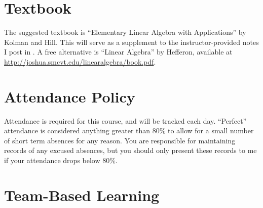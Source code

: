 \documentclass{article}
\begin{document}
\section*{\fontsize{12}{15}\selectfont Textbook}
The suggested textbook is ``Elementary Linear Algebra with Applications'' by Kolman and Hill.  This will serve as a supplement to the instructor-provided notes I post in \LMS.  A free alternative is ``Linear Algebra'' by Hefferon, available at \url{http://joshua.smcvt.edu/linearalgebra/book.pdf}.


\section*{\fontsize{12}{15}\selectfont Attendance Policy}
Attendance is required for this course, and will be tracked each day.
``Perfect'' attendance is considered anything greater than 80\%
to allow for a small number of short term absences for any reason.
You are responsible for maintaining records of any excused absences,
but you should only present these records to me if your attendance drops
below 80\%.


    \section*{\fontsize{12}{15}\selectfont Team-Based Learning}
\end{document}
